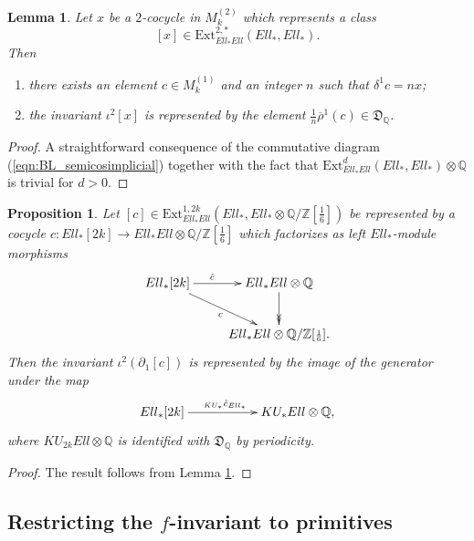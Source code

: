 \documentclass[10pt,a4paper]{amsart}
\newtheorem{prop}[thm]{Proposition}
\newtheorem{lem}[thm]{Lemma}
\theoremstyle{definition}
\theoremstyle{remark}
\newcommand{\qzsix}{{\rat/\zed[{\scriptstyle{\frac{1}{6}}}]}}
\newcommand{\divcong}{\mathfrak{D}}
\newcommand{\ext}{\mathrm{Ext}}
\newcommand{\zed}{\mathbb{Z}}
\newcommand{\rat}{\mathbb{Q}}
\newcommand{\tmfcoeff}{{Ell}}
\begin{document}
\begin{lem}
\label{lem:iota2_rho1}
	Let $x$ be a $2$-cocycle in $M_k^{(2)}$ which represents a class $$[x] \in \ext^{2, *} _{\tmfcoeff_* \tmfcoeff} (\tmfcoeff_*, \tmfcoeff_*).$$ Then
	\begin{enumerate}
		\item
		there exists an element $c \in M_k^{(1)}$ and an integer $n$ such that $\delta^1 c = nx$;
		\item
		the invariant $\iota^2 [x]$ is represented by the element $\frac{1}{n}\overline{\rho}^1 (c) \in \divcong_\rat$.
	\end{enumerate}
\end{lem}

\begin{proof}
	A straightforward consequence of the commutative diagram (\ref{eqn:BL_semicosimplicial}) together with the fact that $\ext^d_{\tmfcoeff_*\tmfcoeff}(\tmfcoeff_* , \tmfcoeff_*) \otimes \rat$ is trivial
for $d >0$.
\end{proof}



\begin{prop}
\label{prop:f-inv_1cocycle}
	Let $[c] \in \ext^{1,2k}_{\tmfcoeff_*\tmfcoeff} (\tmfcoeff_* , \tmfcoeff_* \otimes \qzsix)$ be represented by a
cocycle $c : \tmfcoeff_* [2k] \rightarrow \tmfcoeff_* \tmfcoeff \otimes \qzsix$ which factorizes as
left $\tmfcoeff_*$-module morphisms
\[
	\xymatrix{
\tmfcoeff_*[2k]
\ar[r]^(.4){\hat{c}}
\ar[rd]
_c
&
\tmfcoeff_*\tmfcoeff \otimes \rat
\ar@{->>}[d]
\\
&
\tmfcoeff_*\tmfcoeff \otimes \qzsix.
}
\]
Then the invariant  $\iota^2( \partial_1 [c])$ is represented by the image of the generator
under the map
\[
\xymatrix{
	\tmfcoeff_*[2k]
\ar[rr]^(.45){\ _{KU_*} \hat{c} _{\tmfcoeff_*} }
&&
KU_*\tmfcoeff \otimes \rat,
}
\]
where $KU_{2k} \tmfcoeff\otimes \rat$ is identified with $\divcong_\rat$  by periodicity.
\end{prop}

\begin{proof}
The result follows from Lemma \ref{lem:iota2_rho1}.
\end{proof}




\subsection{Restricting the $f$-invariant to primitives}
\end{document}
